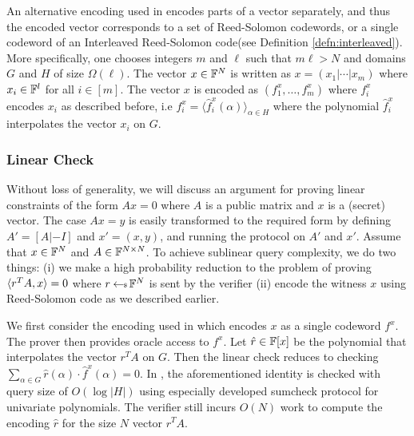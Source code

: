 An alternative encoding used in \cite{Ligero2017} encodes parts of a vector
separately, and thus the encoded vector corresponds to a set of Reed-Solomon
codewords, or a single codeword of an Interleaved Reed-Solomon code(see
Definition \ref{defn:interleaved}). More specifically, one chooses integers $m$
and $\ell$ such that $m\ell > N$ and domains $G$ and $H$ of size
$\Omega(\ell)$. The vector $x\in \mathbb{F}^N$ is written as
$x=(x_1|\cdots|x_m)$ where $x_i\in \mathbb{F}^l$ for all $i\in [m]$. The vector $x$ is
encoded as $(f^x_1,\ldots,f^x_m)$ where $f^x_i$ encodes $x_i$ as described
before, i.e $f^x_i=\langle \hat{f}^x_i(\alpha)\rangle_{\alpha\in H}$ where the
polynomial $\hat{f}^x_i$ interpolates the vector $x_i$ on $G$. 

\subsubsection{Linear Check}
Without loss of generality, we will discuss an argument for proving linear constraints
of the form $Ax=0$ where $A$ is a public matrix and $x$ is a (secret) vector. The
case $Ax=y$ is easily transformed to the required form by defining
$A'=[A|-I]$ and $x'=(x,y)$, and running the protocol on $A'$ and
$x'$. Assume that $x\in \mathbb{F}^N$ and $A\in \mathbb{F}^{N\times N}$. To achieve sublinear query
complexity, we do two things: (i) we make a high probability reduction to the
problem of proving $\langle r^TA,x\rangle=0$ where $r\hskip2.3pt{\gets\!\!\mbox{\tiny${\$}$\normalsize}}\, \mathbb{F}^N$ is sent by
the verifier (ii) encode the witness $x$ using Reed-Solomon code as
we described earlier.

We first consider the encoding used in \cite{Aurora} which encodes $x$ as a
single codeword $f^x$. The prover then provides oracle access to $f^x$. Let
$\hat{r}\in\mathbb{F}[x]$ be the polynomial that interpolates the vector $r^TA$ on $G$.
Then the linear check reduces to checking $\sum_{\alpha\in
G}\hat{r}(\alpha) \cdot \hat{f}^x(\alpha) = 0$. In \cite{Aurora}, the aforementioned
identity is checked with query size of $O(\log|H|)$ using especially developed
sumcheck protocol for univariate polynomials. The verifier still incurs $O(N)$
work to compute the encoding $\hat{r}$ for the size $N$ vector $r^TA$. 


